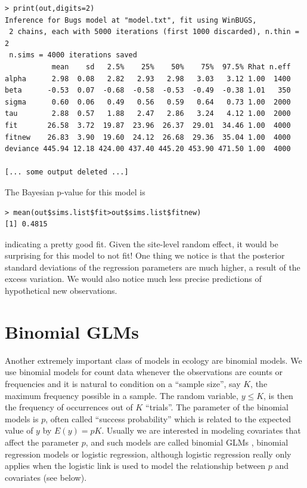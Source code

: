 {\small
\begin{verbatim}
> print(out,digits=2)
Inference for Bugs model at "model.txt", fit using WinBUGS,
 2 chains, each with 5000 iterations (first 1000 discarded), n.thin = 2
 n.sims = 4000 iterations saved
           mean    sd   2.5%    25%    50%    75%  97.5% Rhat n.eff
alpha      2.98  0.08   2.82   2.93   2.98   3.03   3.12 1.00  1400
beta      -0.53  0.07  -0.68  -0.58  -0.53  -0.49  -0.38 1.01   350
sigma      0.60  0.06   0.49   0.56   0.59   0.64   0.73 1.00  2000
tau        2.88  0.57   1.88   2.47   2.86   3.24   4.12 1.00  2000
fit       26.58  3.72  19.87  23.96  26.37  29.01  34.46 1.00  4000
fitnew    26.83  3.90  19.60  24.12  26.68  29.36  35.04 1.00  4000
deviance 445.94 12.18 424.00 437.40 445.20 453.90 471.50 1.00  4000

[... some output deleted ...]
\end{verbatim}
}
The Bayesian p-value for this model is
\begin{verbatim}
> mean(out$sims.list$fit>out$sims.list$fitnew)
[1] 0.4815
\end{verbatim}
indicating a pretty good fit. Given the site-level random effect, it
would be surprising for this model to not fit! One thing we notice is
that the posterior standard deviations of the regression parameters
are much higher, a result of the excess variation. We would also
notice much less precise predictions of hypothetical new
observations.




\section{Binomial GLMs}

Another extremely important class of models in ecology are
binomial models. We use binomial models for count data whenever the
observations are counts or frequencies and it is natural to condition
on a ``sample size'', say $K$, the maximum frequency possible in a sample.
 The random variable, $y \le K$, is then the
frequency of occurrences out of $K$ ``trials''. The parameter of the binomial
models is $p$, often called ``success probability'' which is related
to the expected value of $y$ by $E(y) = pK$. Usually we are interested
in modeling covariates that affect the parameter $p$, and such models
are called binomial GLMs , binomial
regression models or logistic regression, although logistic regression
 really only applies when the logistic link is used to model
the relationship between $p$ and covariates (see below).

